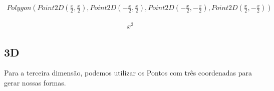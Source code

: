 \documentclass[letterpaper,10pt,english]{jupyterBook}
\begin{document}
\begin{sphinxVerbatim}[commandchars=\\\{\}]
       
\end{sphinxVerbatim}
\begin{equation*}
\begin{split}\displaystyle Polygon\left(Point2D\left(\frac{x}{2}, \frac{x}{2}\right), Point2D\left(- \frac{x}{2}, \frac{x}{2}\right), Point2D\left(- \frac{x}{2}, - \frac{x}{2}\right), Point2D\left(\frac{x}{2}, - \frac{x}{2}\right)\right)\end{split}
\end{equation*}
\begin{sphinxVerbatim}[commandchars=\\\{\}]
\end{sphinxVerbatim}
\begin{equation*}
\begin{split}\displaystyle x^{2}\end{split}
\end{equation*}

\subsection{3D}
\label{\detokenize{chapters/6:id1}}
\sphinxAtStartPar
Para a terceira dimensão, podemos utilizar os Pontos com três coordenadas para gerar nossas formas.
\end{document}
